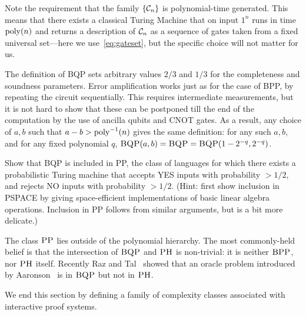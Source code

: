 Note the requirement that the family $\{\mathcal{C}_n\}$ is polynomial-time generated. This means that there exists a classical Turing Machine that on input $1^n$ runs in time $\operatorname{poly}(n)$ and returns a description of $\mathcal{C}_n$ as a sequence of gates taken from a fixed universal set---here we use~\eqref{eq:gateset}, but the specific choice will not matter for us. 

The definition of BQP sets arbitrary values $2/3$ and $1/3$ for the completeness and soundness parameters. Error amplification works just as for the case of BPP, by repeating the circuit sequentially. This requires intermediate measurements, but it is not hard to show that these can be postponed till the end of the computation by the use of ancilla qubits and CNOT gates.
 As a result, any choice of $a,b$ such that $a-b > \operatorname{poly}^{-1}(n)$ gives the same definition: for any such $a,b$, and for any fixed polynomial $q$,  $\textsc{BQP}(a,b)=\textsc{BQP}=\textsc{BQP}(1-2^{-q},2^{-q})$. 


\begin{exercise}\label{ex:pp}
Show that BQP is included in PP, the class of languages for which there exists a probabilistic Turing machine that accepts YES inputs with probability $>1/2$, and rejects NO inputs with probability $>1/2$. (Hint: first show inclusion in PSPACE by giving space-efficient implementations of basic linear algebra operations. Inclusion in PP follows from similar arguments, but is a bit more delicate.)
\end{exercise}

The class $\textsc{PP}$ lies outside of the polynomial hierarchy. The most commonly-held belief is that the intersection of $\textsc{BQP}$ and $\textsc{PH}$ is non-trivial: it is neither $\textsc{BPP}$, nor $\textsc{PH}$ itself. Recently Raz and Tal~\cite{raz2019oracle} showed that an oracle problem introduced by Aaronson~\cite{aaronson2010bqp} is in $\textsc{BQP}$ but not in $\textsc{PH}$. 

We end this section by defining a family of complexity classes associated with interactive proof systems. 

